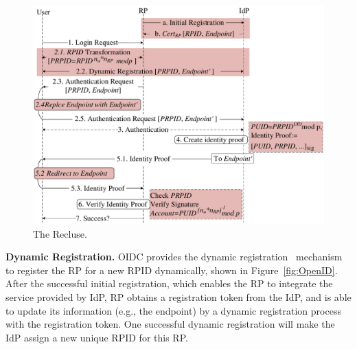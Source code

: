 \begin{figure}[t]
  \centering
  \includegraphics[width=\linewidth]{fig/overview1.pdf}
  \caption{The Recluse.}
  \label{fig:Recluse}
\end{figure}

\noindent\textbf{Dynamic Registration.} OIDC provides the dynamic registration~\cite{DynamicRegistration} mechanism to register the RP for a new RPID dynamically, shown in Figure~\ref{fig:OpenID}.
After the successful initial registration, which enables the RP to integrate the service provided by IdP, RP obtains a registration token from the IdP, and is able to update its information (e.g., the endpoint) by a dynamic registration process with the  registration token.
One successful dynamic registration will make the IdP assign a new unique RPID for this RP.


